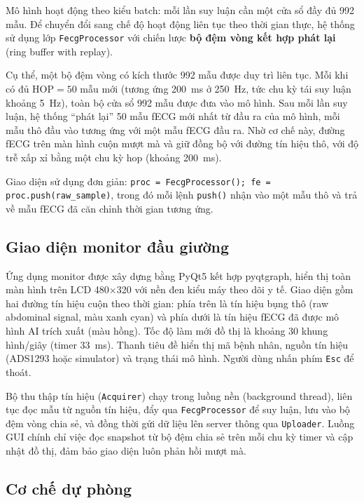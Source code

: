 \documentclass[../DoAn.tex]{subfiles}
\begin{document}
Mô hình hoạt động theo kiểu batch: mỗi lần suy luận cần một cửa sổ đầy đủ 992 mẫu. Để chuyển đổi sang chế độ hoạt động liên tục theo thời gian thực, hệ thống sử dụng lớp \texttt{FecgProcessor} với chiến lược \textbf{bộ đệm vòng kết hợp phát lại} (ring buffer with replay).

Cụ thể, một bộ đệm vòng có kích thước 992 mẫu được duy trì liên tục. Mỗi khi có đủ $\text{HOP} = 50$ mẫu mới (tương ứng 200~ms ở 250~Hz, tức chu kỳ tái suy luận khoảng 5~Hz), toàn bộ cửa sổ 992 mẫu được đưa vào mô hình. Sau mỗi lần suy luận, hệ thống ``phát lại'' 50 mẫu fECG mới nhất từ đầu ra của mô hình, mỗi mẫu thô đầu vào tương ứng với một mẫu fECG đầu ra. Nhờ cơ chế này, đường fECG trên màn hình cuộn mượt mà và giữ đồng bộ với đường tín hiệu thô, với độ trễ xấp xỉ bằng một chu kỳ hop (khoảng 200~ms).

Giao diện sử dụng đơn giản: \texttt{proc = FecgProcessor(); fe = proc.push(raw\_sample)}, trong đó mỗi lệnh \texttt{push()} nhận vào một mẫu thô và trả về mẫu fECG đã căn chỉnh thời gian tương ứng.

\subsection{Giao diện monitor đầu giường}

Ứng dụng monitor được xây dựng bằng PyQt5 kết hợp pyqtgraph, hiển thị toàn màn hình trên LCD 480$\times$320 với nền đen kiểu máy theo dõi y tế. Giao diện gồm hai đường tín hiệu cuộn theo thời gian: phía trên là tín hiệu bụng thô (raw abdominal signal, màu xanh cyan) và phía dưới là tín hiệu fECG đã được mô hình AI trích xuất (màu hồng). Tốc độ làm mới đồ thị là khoảng 30 khung hình/giây (timer 33~ms). Thanh tiêu đề hiển thị mã bệnh nhân, nguồn tín hiệu (ADS1293 hoặc simulator) và trạng thái mô hình. Người dùng nhấn phím \texttt{Esc} để thoát.

Bộ thu thập tín hiệu (\texttt{Acquirer}) chạy trong luồng nền (background thread), liên tục đọc mẫu từ nguồn tín hiệu, đẩy qua \texttt{FecgProcessor} để suy luận, lưu vào bộ đệm vòng chia sẻ, và đồng thời gửi dữ liệu lên server thông qua \texttt{Uploader}. Luồng GUI chính chỉ việc đọc snapshot từ bộ đệm chia sẻ trên mỗi chu kỳ timer và cập nhật đồ thị, đảm bảo giao diện luôn phản hồi mượt mà.

\subsection{Cơ chế dự phòng}
\end{document}
